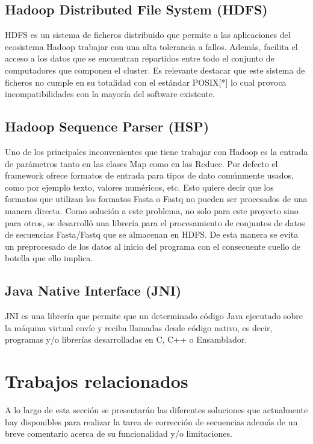 \documentclass[conference]{IEEEtran}
\begin{document}
\subsection{Hadoop Distributed File System (HDFS)}
HDFS\cite{hadoop_hdfs} es un sistema de ficheros distribuido que permite a las aplicaciones del ecosistema Hadoop trabajar con una alta tolerancia a fallos. Además, facilita el acceso a los datos que se encuentran repartidos entre todo el conjunto de computadores que componen el cluster. Es relevante destacar que este sistema de ficheros no cumple en su totalidad con el estándar POSIX[*] lo cual provoca incompatibilidades con la mayoría del software existente.

\subsection{Hadoop Sequence Parser (HSP)}
Uno de los principales inconvenientes que tiene trabajar con Hadoop es la entrada de parámetros tanto en las clases Map como en las Reduce. Por defecto el framework ofrece formatos de entrada para tipos de dato comúnmente usados, como por ejemplo texto, valores numéricos, etc. Esto quiere decir que los formatos que utilizan los formatos Fasta o Fastq\cite{fastq} no pueden ser procesados de una manera directa. Como solución a este problema, no solo para este proyecto sino para otros, se desarrolló una librería para el procesamiento de conjuntos de datos de secuencias Fasta/Fastq que se almacenan en HDFS. De esta manera se evita un preprocesado de los datos al inicio del programa con el consecuente cuello de botella que ello implica.

\subsection{Java Native Interface (JNI)}
JNI\cite{jni} es una librería que permite que un determinado código Java ejecutado sobre la máquina virtual envíe y reciba llamadas desde código nativo, es decir, programas y/o librerías desarrolladas en C, C++ o Ensamblador.

\section{Trabajos relacionados}

A lo largo de esta sección se presentarán las diferentes soluciones que actualmente hay disponibles para realizar la tarea de corrección de secuencias además de un breve comentario acerca de su funcionalidad y/o limitaciones.
\end{document}
